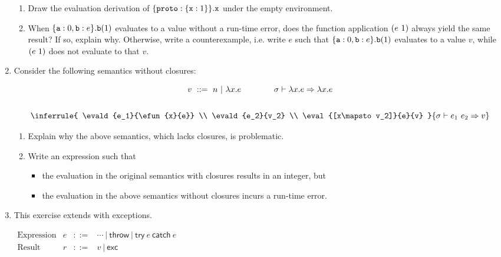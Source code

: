 \begin{enumerate}
\begin{enumerate}
  \item Draw the evaluation derivation of $\{\texttt{proto}:\{\texttt{x}:1\}\}.\texttt{x}$ under
    the empty environment.

  \item
    When $\{ \texttt{a}:0, \texttt{b}:e \}.\texttt{b}(1)$ evaluates to a value without a run-time
    error, does the function
    application $(e\ 1)$ always yield the same result? If so, explain why. Otherwise,
    write a counterexample, i.e. write $e$ such that
    $\{ \texttt{a}:0, \texttt{b}:e \}.\texttt{b}(1)$ evaluates to a value $v$, while
    $(e\ 1)$ does not evaluate to that $v$.

\end{enumerate}

\item Consider the following semantics without closures:

\[
\begin{array}{c}
  v\ ::=\ n\ |\ \efun{x}{e} \qquad\qquad
  \evald{\efun{x}{e}}{\efun{x}{e}}
  \\[2em]
  \inferrule
  { \evald{e_1}{\efun{x}{e}} \\
    \evald{e_2}{v_2} \\
    \eval{[x\mapsto v_2]}{e}{v} }
  { \evald{\eapp{e_1}{e_2}}{v} }
\end{array}
\]

\begin{enumerate}
  \item
    Explain why the above semantics, which lacks closures, is problematic.
  \item
    Write an \lang expression such that
    \begin{itemize}
        \item the evaluation in the original semantics with closures results
          in an integer, but
        \item the evaluation in the above semantics without closures incurs
          a run-time error.
    \end{itemize}
\end{enumerate}

\item This exercise extends \lang with exceptions.

$
  \begin{array}{lrrl}
    \text{Expression} & e & ::= & \cdots\ |\ \textsf{throw}\ |\ \textsf{try}\ e\ \textsf{catch}\ e \\
    \text{Result} & r & ::= & v\ |\ \textsf{exc} \\
  \end{array}
$


\end{enumerate}
